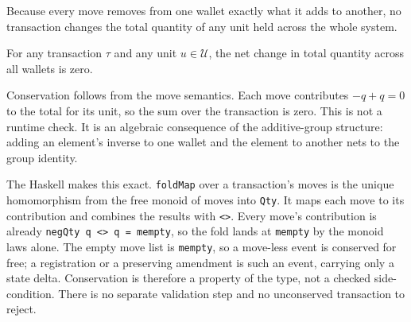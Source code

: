 Because every move removes from one wallet exactly what it adds to another, no transaction changes the total quantity of any unit held across the whole system.

\begin{principle}
\label{cond:conservation}
For any transaction $\tau$ and any unit $u \in \mathcal{U}$, the net change in total quantity across all wallets is zero.
\end{principle}

Conservation follows from the move semantics. Each move contributes $-q + q = 0$ to the total for its unit, so the sum over the transaction is zero. This is not a runtime check. It is an algebraic consequence of the additive-group structure: adding an element's inverse to one wallet and the element to another nets to the group identity.

The Haskell makes this exact. \texttt{foldMap} over a transaction's moves is the unique homomorphism from the free monoid of moves into \texttt{Qty}. It maps each move to its contribution and combines the results with \texttt{<>}. Every move's contribution is already \texttt{negQty q <> q = mempty}, so the fold lands at \texttt{mempty} by the monoid laws alone. The empty move list is \texttt{mempty}, so a move-less event is conserved for free; a registration or a preserving amendment is such an event, carrying only a state delta. Conservation is therefore a property of the type, not a checked side-condition. There is no separate validation step and no unconserved transaction to reject.

